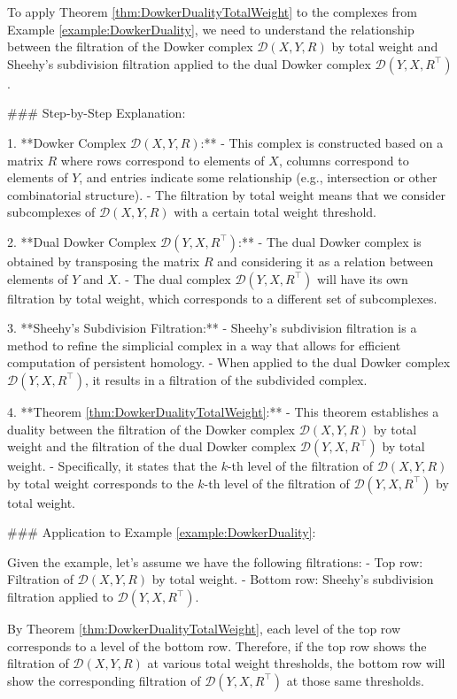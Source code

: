 To apply Theorem \ref{thm:DowkerDualityTotalWeight} to the complexes from Example \ref{example:DowkerDuality}, we need to understand the relationship between the filtration of the Dowker complex \(\mathcal{D}(X, Y, R)\) by total weight and Sheehy's subdivision filtration applied to the dual Dowker complex \(\mathcal{D}(Y, X, R^\top)\).

### Step-by-Step Explanation:

1. **Dowker Complex \(\mathcal{D}(X, Y, R)\):**
   - This complex is constructed based on a matrix \(R\) where rows correspond to elements of \(X\), columns correspond to elements of \(Y\), and entries indicate some relationship (e.g., intersection or other combinatorial structure).
   - The filtration by total weight means that we consider subcomplexes of \(\mathcal{D}(X, Y, R)\) with a certain total weight threshold.

2. **Dual Dowker Complex \(\mathcal{D}(Y, X, R^\top)\):**
   - The dual Dowker complex is obtained by transposing the matrix \(R\) and considering it as a relation between elements of \(Y\) and \(X\).
   - The dual complex \(\mathcal{D}(Y, X, R^\top)\) will have its own filtration by total weight, which corresponds to a different set of subcomplexes.

3. **Sheehy's Subdivision Filtration:**
   - Sheehy's subdivision filtration is a method to refine the simplicial complex in a way that allows for efficient computation of persistent homology.
   - When applied to the dual Dowker complex \(\mathcal{D}(Y, X, R^\top)\), it results in a filtration of the subdivided complex.

4. **Theorem \ref{thm:DowkerDualityTotalWeight}:**
   - This theorem establishes a duality between the filtration of the Dowker complex \(\mathcal{D}(X, Y, R)\) by total weight and the filtration of the dual Dowker complex \(\mathcal{D}(Y, X, R^\top)\) by total weight.
   - Specifically, it states that the \(k\)-th level of the filtration of \(\mathcal{D}(X, Y, R)\) by total weight corresponds to the \(k\)-th level of the filtration of \(\mathcal{D}(Y, X, R^\top)\) by total weight.

### Application to Example \ref{example:DowkerDuality}:

Given the example, let's assume we have the following filtrations:
- Top row: Filtration of \(\mathcal{D}(X, Y, R)\) by total weight.
- Bottom row: Sheehy's subdivision filtration applied to \(\mathcal{D}(Y, X, R^\top)\).

By Theorem \ref{thm:DowkerDualityTotalWeight}, each level of the top row corresponds to a level of the bottom row. Therefore, if the top row shows the filtration of \(\mathcal{D}(X, Y, R)\) at various total weight thresholds, the bottom row will show the corresponding filtration of \(\mathcal{D}(Y, X, R^\top)\) at those same thresholds.

